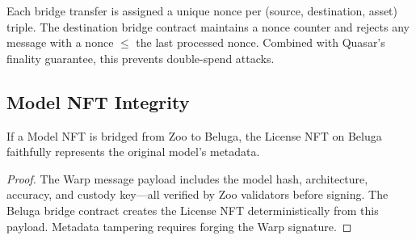 Each bridge transfer is assigned a unique nonce per (source, destination, asset) triple. The destination bridge contract maintains a nonce counter and rejects any message with a nonce $\leq$ the last processed nonce. Combined with Quasar's finality guarantee, this prevents double-spend attacks.

\subsection{Model NFT Integrity}

\begin{theorem}
If a Model NFT is bridged from Zoo to Beluga, the License NFT on Beluga faithfully represents the original model's metadata.
\end{theorem}

\begin{proof}
The Warp message payload includes the model hash, architecture, accuracy, and custody key---all verified by Zoo validators before signing. The Beluga bridge contract creates the License NFT deterministically from this payload. Metadata tampering requires forging the Warp signature.
\end{proof}

